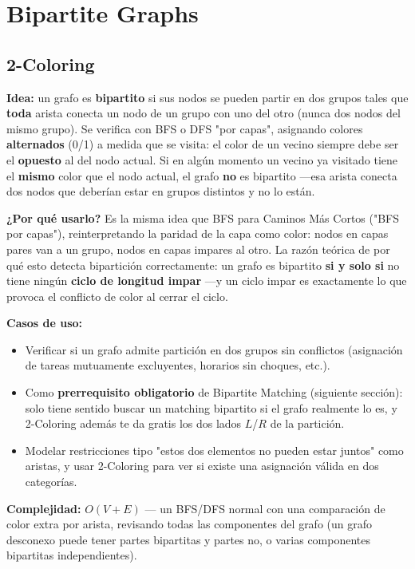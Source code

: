 \documentclass[10pt,a4paper,twocolumn]{article}
\begin{document}
\section{Bipartite Graphs}
\subsection{2-Coloring}

\textbf{Idea:} un grafo es \textbf{bipartito} si sus nodos se pueden
partir en dos grupos tales que \textbf{toda} arista conecta un nodo
de un grupo con uno del otro (nunca dos nodos del mismo grupo). Se
verifica con BFS o DFS "por capas", asignando colores
\textbf{alternados} (0/1) a medida que se visita: el color de un
vecino siempre debe ser el \textbf{opuesto} al del nodo actual. Si en
algún momento un vecino ya visitado tiene el \textbf{mismo} color que
el nodo actual, el grafo \textbf{no} es bipartito —esa arista conecta
dos nodos que deberían estar en grupos distintos y no lo están.

\textbf{¿Por qué usarlo?} Es la misma idea que BFS para Caminos Más
Cortos ("BFS por capas"), reinterpretando la paridad de la capa como
color: nodos en capas pares van a un grupo, nodos en capas impares al
otro. La razón teórica de por qué esto detecta bipartición
correctamente: un grafo es bipartito \textbf{si y solo si} no tiene
ningún \textbf{ciclo de longitud impar} —y un ciclo impar es
exactamente lo que provoca el conflicto de color al cerrar el ciclo.

\textbf{Casos de uso:}

\begin{itemize}
	\item Verificar si un grafo admite partición en dos grupos sin
	conflictos (asignación de tareas mutuamente excluyentes, horarios
	sin choques, etc.).
	\item Como \textbf{prerrequisito obligatorio} de Bipartite
	Matching (siguiente sección): solo tiene sentido buscar un
	matching bipartito si el grafo realmente lo es, y 2-Coloring
	además te da gratis los dos lados $L$/$R$ de la partición.
	\item Modelar restricciones tipo "estos dos elementos no pueden
	estar juntos" como aristas, y usar 2-Coloring para ver si existe
	una asignación válida en dos categorías.
\end{itemize}

\textbf{Complejidad:} $O(V + E)$ — un BFS/DFS normal con una
comparación de color extra por arista, revisando todas las
componentes del grafo (un grafo desconexo puede tener partes
bipartitas y partes no, o varias componentes bipartitas
independientes).
\end{document}
